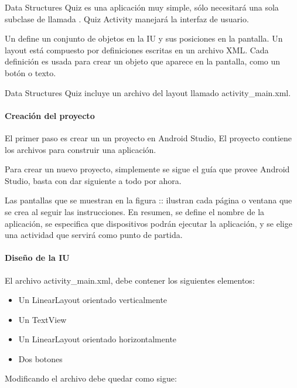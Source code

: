 Data Structures Quiz es una aplicación muy simple, sólo necesitará una sola
subclase de  llamada . Quiz Activity manejará la
interfaz de usuario.

Un  define un conjunto de objetos en la IU y sus posiciones en la
pantalla. Un layout está compuesto por definiciones escritas en un archivo
XML. Cada definición es usada para crear un objeto que aparece en la pantalla,
como un botón o texto.

Data Structures Quiz incluye un archivo del layout llamado activity\_main.xml.


\paragraph{Creación del proyecto}
\label{\detokenize{dev_docs:creacion-del-proyecto}}
El primer paso es crear un un proyecto en Android Studio, El proyecto contiene
los archivos para construir una aplicación.

Para crear un nuevo proyecto, simplemente se sigue el guía que provee Android
Studio, basta con dar siguiente a todo por ahora.

Las pantallas que se muestran en la figura :: ilustran cada página o ventana
que se crea al seguir las instrucciones. En resumen, se define el nombre
de la aplicación, se especifica que dispositivos podrán ejecutar la aplicación,
y se elige una actividad que servirá como punto de partida.


\paragraph{Diseño de la IU}
\label{\detokenize{dev_docs:diseno-de-la-iu}}
El archivo activity\_main.xml, debe contener los siguientes elementos:
\begin{itemize}
\item {} 
Un LinearLayout orientado verticalmente

\item {} 
Un TextView

\item {} 
Un LinearLayout orientado horizontalmente

\item {} 
Dos botones

\end{itemize}

Modificando el archivo debe quedar como sigue:

